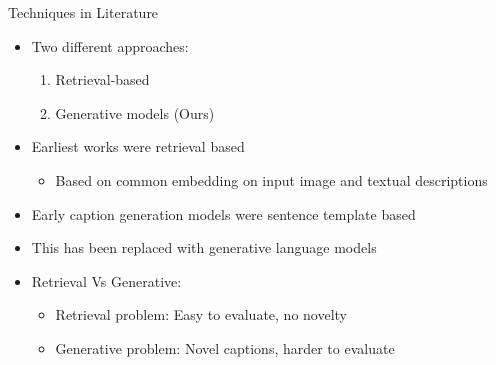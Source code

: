 \documentclass{beamer}
\begin{document}
\begin{frame}{Techniques in Literature}
\begin{itemize}
  \item Two different approaches:
      \begin{enumerate}
        \item Retrieval-based 
        \item Generative models (Ours)
      \end{enumerate}
  \item<2-> Earliest works were retrieval based~\cite{Farhadi2010, Hodosh2013, Karpathy2014}
          {\begin{itemize}
          \item Based on common embedding on input image and textual descriptions  
      \end{itemize}}
  \item<3-> Early caption generation models were sentence template based
  \item<4-> This has been replaced with generative language models 
  \item<5-> Retrieval Vs Generative: 
      \begin{itemize}
        \item Retrieval problem: Easy to evaluate, no novelty 
        \item Generative problem: Novel captions, harder to evaluate
      \end{itemize}
\end{itemize} 
\end{frame}
\end{document}

